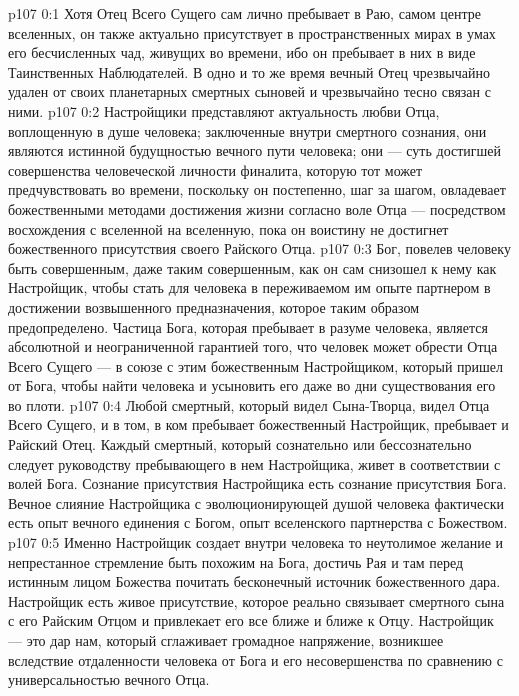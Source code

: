 \author{Одиночный Вестник}
\vs p107 0:1 Хотя Отец Всего Сущего сам лично пребывает в Раю, самом центре вселенных, он также актуально присутствует в пространственных мирах в умах его бесчисленных чад, живущих во времени, ибо он пребывает в них в виде Таинственных Наблюдателей. В одно и то же время вечный Отец чрезвычайно удален от своих планетарных смертных сыновей и чрезвычайно тесно связан с ними.
\vs p107 0:2 Настройщики представляют актуальность любви Отца, воплощенную в душе человека; заключенные внутри смертного сознания, они являются истинной будущностью вечного пути человека; они --- суть достигшей совершенства человеческой личности финалита, которую тот может предчувствовать во времени, поскольку он постепенно, шаг за шагом, овладевает божественными методами достижения жизни согласно воле Отца --- посредством восхождения с вселенной на вселенную, пока он воистину не достигнет божественного присутствия своего Райского Отца.
\vs p107 0:3 Бог, повелев человеку быть совершенным, даже таким совершенным, как он сам снизошел к нему как Настройщик, чтобы стать для человека в переживаемом им опыте партнером в достижении возвышенного предназначения, которое таким образом предопределено. Частица Бога, которая пребывает в разуме человека, является абсолютной и неограниченной гарантией того, что человек может обрести Отца Всего Сущего --- в союзе с этим божественным Настройщиком, который пришел от Бога, чтобы найти человека и усыновить его даже во дни существования его во плоти.
\vs p107 0:4 Любой смертный, который видел Сына\hyp{}Творца, видел Отца Всего Сущего, и в том, в ком пребывает божественный Настройщик, пребывает и Райский Отец. Каждый смертный, который сознательно или бессознательно следует руководству пребывающего в нем Настройщика, живет в соответствии с волей Бога. Сознание присутствия Настройщика есть сознание присутствия Бога. Вечное слияние Настройщика с эволюционирующей душой человека фактически есть опыт вечного единения с Богом, опыт вселенского партнерства с Божеством.
\vs p107 0:5 Именно Настройщик создает внутри человека то неутолимое желание и непрестанное стремление быть похожим на Бога, достичь Рая и там перед истинным лицом Божества почитать бесконечный источник божественного дара. Настройщик есть живое присутствие, которое реально связывает смертного сына с его Райским Отцом и привлекает его все ближе и ближе к Отцу. Настройщик --- это дар нам, который сглаживает громадное напряжение, возникшее вследствие отдаленности человека от Бога и его несовершенства по сравнению с универсальностью вечного Отца.
